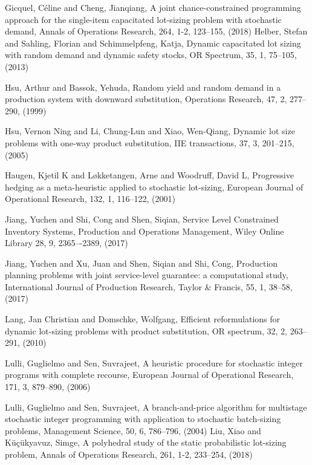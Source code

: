 \documentclass[10pt]{article}
\begin{document}
\begin{thebibliography}{99}
Gicquel, C{\'e}line and Cheng, Jianqiang, A joint chance-constrained programming approach for the single-item capacitated lot-sizing problem with stochastic demand, Annals of Operations Research, 264, 1-2, 123--155, (2018)
 Helber, Stefan and Sahling, Florian and Schimmelpfeng, Katja, Dynamic capacitated lot sizing with random demand and dynamic safety stocks, OR Spectrum, 35, 1, 75--105, (2013)
 

Hsu, Arthur and Bassok, Yehuda, Random yield and random demand in a production system with downward substitution, Operations Research, 47, 2, 277--290,
  (1999)
  
Hsu, Vernon Ning and Li, Chung-Lun and Xiao, Wen-Qiang, Dynamic lot size problems with one-way product substitution, IIE transactions, 37, 3, 201--215, (2005)

Haugen, Kjetil K and L{\o}kketangen, Arne and Woodruff, David L, Progressive hedging as a meta-heuristic applied to stochastic lot-sizing, European Journal of Operational Research, 132, 1, 116--122, (2001)


 Jiang, Yuchen and Shi, Cong and Shen, Siqian, Service Level Constrained Inventory Systems, Production and Operations Management, Wiley Online Library 28, 9, 2365–-2389,
 (2017)
 
 Jiang, Yuchen and Xu, Juan and Shen, Siqian and Shi, Cong, Production planning problems with joint service-level guarantee: a computational study, International Journal of Production Research, Taylor \& Francis, 55, 1, 38--58,
 (2017)
 
 Lang, Jan Christian and Domschke, Wolfgang, Efficient reformulations for dynamic lot-sizing problems with product substitution, OR spectrum,
32, 2, 263--291, (2010)

 Lulli, Guglielmo and Sen, Suvrajeet, A heuristic procedure for stochastic integer programs with complete recourse, European Journal of Operational Research,
171, 3, 879--890, (2006)

Lulli, Guglielmo and Sen, Suvrajeet, A branch-and-price algorithm for multistage stochastic integer programming with application to stochastic batch-sizing problems, Management Science, 50, 6, 786--796, (2004)
Liu, Xiao and K{\"u}{\c{c}}{\"u}kyavuz, Simge, A polyhedral study of the static probabilistic lot-sizing problem, Annals of Operations Research, 261, 1-2,
233--254, (2018)


\end{thebibliography}
\end{document}
